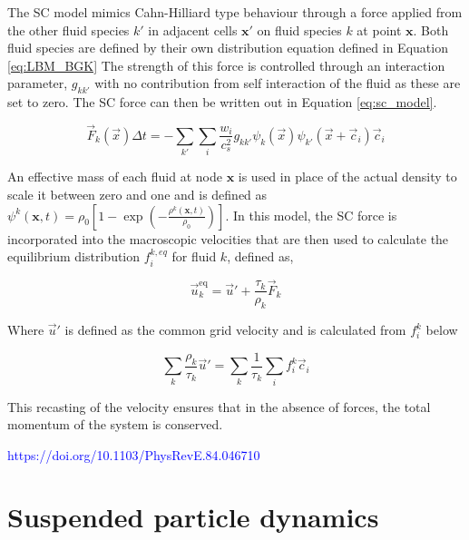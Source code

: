 The SC model mimics Cahn-Hilliard type behaviour through a force applied from the other fluid species $k'$ in adjacent 
cells $\mathbf{x'}$ on fluid species $k$ at point $\mathbf{x}$. \cite{shan_lattice_1993, shan_simulation_1994, 
shan_multicomponent_1995, he_discrete_1998, jansen_bijels_2011, chin_lattice_2002} Both fluid species are defined
 by their own distribution equation defined in Equation \ref{eq:LBM_BGK} The strength of this force is controlled 
 through an interaction parameter, $g_{kk'}$ with no contribution from self interaction of the fluid as these are 
 set to zero. The SC force can then be written out in Equation \ref{eq:sc_model}.

\begin{equation}
\vec{F}_k(\vec{x}) \Delta t = - \sum_{k'} \sum_i \frac{w_i}{c_s^2} g_{kk'} \psi_k(\vec{x})\psi_{k'}(\vec{x}+\vec{c}_i) \vec{c}_i
\label{eq:sc_model}
\end{equation}

An effective mass of each fluid at node $\mathbf{x}$ is used in place of the actual density to scale it between zero 
and one and is defined as $\psi^{k}(\mathbf{x},t) = \rho_{0}\left[1 - \exp(-\frac{\rho^{k}(\mathbf{x}, t)}{\rho_{0}})\right]$. 
In this model, the SC force is incorporated into the macroscopic velocities that are then used to calculate the equilibrium
distribution $f_{i}^{k, eq}$ for fluid $k$, defined as,

\begin{equation}
\vec{u}_k^{\text{eq}} = \vec{u}' + \frac{\tau_k}{\rho_k} \vec{F}_k
\end{equation}

Where $\vec{u}'$ is defined as the common grid velocity and is calculated from $f_i^k$ below

\begin{equation}
    \sum_k \frac{\rho_k}{\tau_k} \vec{u}' = \sum_k \frac{1}{\tau_k}\sum_i f_i^k\vec{c}_i
\end{equation}

This recasting of the velocity ensures that in the absence of forces, the total momentum of the system is conserved. 

\textcolor{blue}{https://doi.org/10.1103/PhysRevE.84.046710}

\section{Suspended particle dynamics}
\label{section:lbm_colloids}

